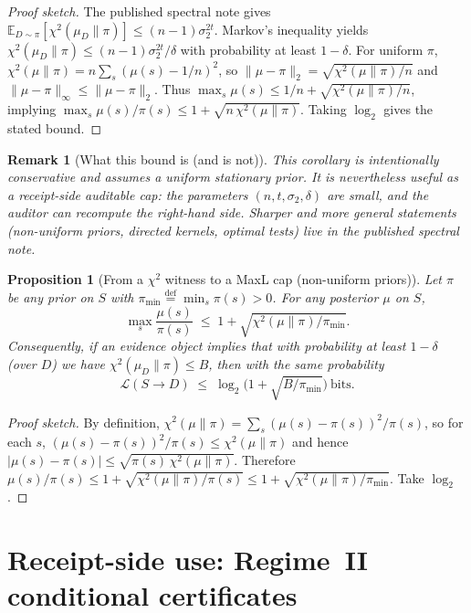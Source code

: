 \documentclass[11pt]{article}
\newtheorem{proposition}{Proposition}
\newtheorem{remark}{Remark}
\newcommand{\EE}{\mathbb{E}}
\newcommand{\defeq}{\stackrel{\mathrm{def}}{=}}
\newcommand{\MaxL}{\mathcal{L}}
\begin{document}
\begin{proof}[Proof sketch]
The published spectral note gives
$\EE_{D\sim\pi}\!\left[\chi^2(\mu_D\|\pi)\right]\le (n-1)\sigma_2^{2t}$.\cite{series:spectral}
Markov's inequality yields $\chi^2(\mu_D\|\pi)\le (n-1)\sigma_2^{2t}/\delta$ with probability at least $1-\delta$.
For uniform $\pi$, $\chi^2(\mu\|\pi)=n\sum_s(\mu(s)-1/n)^2$, so
$\|\mu-\pi\|_2 = \sqrt{\chi^2(\mu\|\pi)/n}$ and $\|\mu-\pi\|_\infty\le \|\mu-\pi\|_2$.
Thus $\max_s \mu(s)\le 1/n+\sqrt{\chi^2(\mu\|\pi)/n}$, implying
$\max_s \mu(s)/\pi(s)\le 1+\sqrt{n\,\chi^2(\mu\|\pi)}$.
Taking $\log_2$ gives the stated bound.
\end{proof}

\begin{remark}[What this bound is (and is not)]
This corollary is intentionally conservative and assumes a uniform stationary prior.
It is nevertheless useful as a receipt-side \emph{auditable} cap: the parameters $(n,t,\sigma_2,\delta)$ are small, and the auditor can recompute the right-hand side.
Sharper and more general statements (non-uniform priors, directed kernels, optimal tests) live in the published spectral note.\cite{series:spectral}
\end{remark}

\begin{proposition}[From a $\chi^2$ witness to a MaxL cap (non-uniform priors)]
\label{prop:chi2-to-maxl}
Let $\pi$ be any prior on $S$ with $\pi_{\min}\defeq \min_s \pi(s)>0$.
For any posterior $\mu$ on $S$,
\[
\max_s \frac{\mu(s)}{\pi(s)}\;\le\;1+\sqrt{\chi^2(\mu\|\pi)/\pi_{\min}}.
\]
Consequently, if an evidence object implies that with probability at least $1-\delta$ (over $D$) we have $\chi^2(\mu_D\|\pi)\le B$, then with the same probability
\[
\MaxL(S\!\to\!D)\;\le\;\log_2\!\Big(1+\sqrt{B/\pi_{\min}}\Big)\ \text{bits}.
\]
\end{proposition}

\begin{proof}[Proof sketch]
By definition, $\chi^2(\mu\|\pi)=\sum_s (\mu(s)-\pi(s))^2/\pi(s)$, so for each $s$,
$(\mu(s)-\pi(s))^2/\pi(s)\le \chi^2(\mu\|\pi)$ and hence
$|\mu(s)-\pi(s)|\le \sqrt{\pi(s)\,\chi^2(\mu\|\pi)}$.
Therefore
$\mu(s)/\pi(s)\le 1+\sqrt{\chi^2(\mu\|\pi)/\pi(s)}\le 1+\sqrt{\chi^2(\mu\|\pi)/\pi_{\min}}$.
Take $\log_2$.
\end{proof}


\section{Receipt-side use: Regime~II conditional certificates}
\label{sec:receipt-use}
\end{document}
